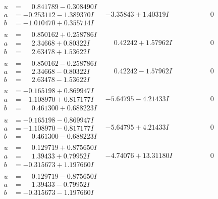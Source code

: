 \documentclass[1p]{elsarticle_modified}
\theoremstyle{definition}
\begin{document}
$$\begin{array}{c|c|c}
\begin{aligned}
u &= \phantom{-}0.841789 - 0.308490 I \\
a &= -0.253112 - 1.389370 I \\
b &= -1.010470 + 0.355714 I\end{aligned}
 & -3.35843 + 1.40319 I & \phantom{-0.000000 } 0 \\ \hline\begin{aligned}
u &= \phantom{-}0.850162 + 0.258786 I \\
a &= \phantom{-}2.34668 + 0.80322 I \\
b &= \phantom{-}2.63478 + 1.53622 I\end{aligned}
 & \phantom{-}0.42242 + 1.57962 I & \phantom{-0.000000 } 0 \\ \hline\begin{aligned}
u &= \phantom{-}0.850162 - 0.258786 I \\
a &= \phantom{-}2.34668 - 0.80322 I \\
b &= \phantom{-}2.63478 - 1.53622 I\end{aligned}
 & \phantom{-}0.42242 - 1.57962 I & \phantom{-0.000000 } 0 \\ \hline\begin{aligned}
u &= -0.165198 + 0.869947 I \\
a &= -1.108970 + 0.817177 I \\
b &= \phantom{-}0.461300 + 0.688223 I\end{aligned}
 & -5.64795 - 4.21433 I & \phantom{-0.000000 } 0 \\ \hline\begin{aligned}
u &= -0.165198 - 0.869947 I \\
a &= -1.108970 - 0.817177 I \\
b &= \phantom{-}0.461300 - 0.688223 I\end{aligned}
 & -5.64795 + 4.21433 I & \phantom{-0.000000 } 0 \\ \hline\begin{aligned}
u &= \phantom{-}0.129719 + 0.875650 I \\
a &= \phantom{-}1.39433 + 0.79952 I \\
b &= -0.315673 + 1.197660 I\end{aligned}
 & -4.74076 + 13.31180 I & \phantom{-0.000000 } 0 \\ \hline\begin{aligned}
u &= \phantom{-}0.129719 - 0.875650 I \\
a &= \phantom{-}1.39433 - 0.79952 I \\
b &= -0.315673 - 1.197660 I\end{aligned}

\end{array}$$
\end{document}
